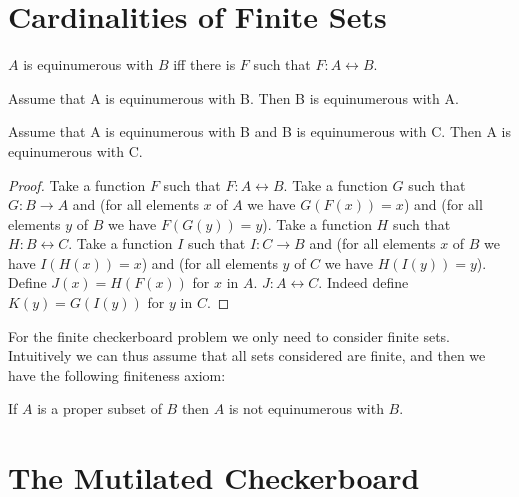 \documentclass{article}
\begin{document}
\section{Cardinalities of Finite Sets}

\begin{forthel}
    \begin{definition}
        $A$ is equinumerous with $B$ iff there is $F$ such that $F : A \leftrightarrow B$.
    \end{definition}

    \begin{lemma}
        Assume that A is equinumerous with B. Then B is equinumerous with A.
    \end{lemma}

    \begin{lemma}
        Assume that A is equinumerous with B and B is equinumerous with C.
        Then A is equinumerous with C.
    \end{lemma}
    \begin{proof}
        Take a function $F$ such that $F : A \leftrightarrow B$.
        Take a function $G$ such that $G : B \to A$ and (for all elements $x$ of $A$ we have $G(F(x)) = x$) and
        (for all elements $y$ of $B$ we have $F(G(y))=y$).
        Take a function $H$ such that $H : B \leftrightarrow C$.
        Take a function $I$ such that $I : C \to B$ and (for all elements $x$ of $B$ we have $I(H(x)) = x$) and
        (for all elements $y$ of $C$ we have $H(I(y))=y$).
        Define $J(x) = H(F(x))$ for $x$ in $A$.
        $J : A \leftrightarrow C$. Indeed define $K(y) = G(I(y))$ for $y$ in $C$.
    \end{proof}
\end{forthel}


For the finite checkerboard problem we only need to consider finite sets.
Intuitively we can thus assume that all sets considered are finite, and then
we have the following finiteness axiom:

\begin{forthel}
    \begin{axiom}
        If $A$ is a proper subset of $B$ then $A$ is not equinumerous with $B$.
    \end{axiom}
\end{forthel}


\section{The Mutilated Checkerboard}
\end{document}

